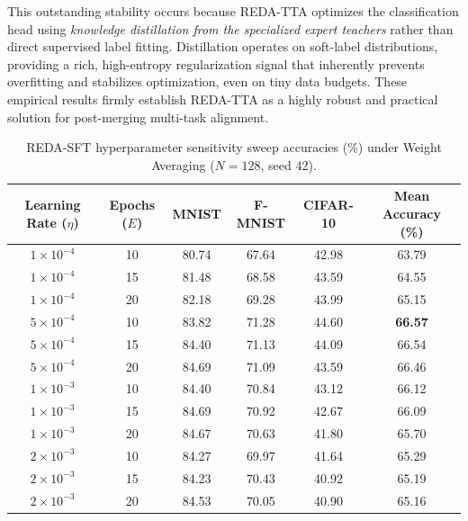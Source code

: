 \documentclass{article}
\theoremstyle{plain}
\theoremstyle{definition}
\theoremstyle{remark}
\begin{document}
This outstanding stability occurs because REDA-TTA optimizes the classification head using \textit{knowledge distillation from the specialized expert teachers} rather than direct supervised label fitting. Distillation operates on soft-label distributions, providing a rich, high-entropy regularization signal that inherently prevents overfitting and stabilizes optimization, even on tiny data budgets. These empirical results firmly establish REDA-TTA as a highly robust and practical solution for post-merging multi-task alignment.

\begin{table}[h]
  \caption{REDA-SFT hyperparameter sensitivity sweep accuracies (\%) under Weight Averaging ($N=128$, seed 42).}
  \label{tab:sft_sweep}
  \centering
  \small
  \begin{tabular}{cccccc}
    \toprule
    Learning Rate ($\eta$) & Epochs ($E$) & MNIST & F-MNIST & CIFAR-10 & Mean Accuracy (\%) \\
    \midrule
    $1 \times 10^{-4}$ & 10 & 80.74 & 67.64 & 42.98 & 63.79 \\
    $1 \times 10^{-4}$ & 15 & 81.48 & 68.58 & 43.59 & 64.55 \\
    $1 \times 10^{-4}$ & 20 & 82.18 & 69.28 & 43.99 & 65.15 \\
    \midrule
    $5 \times 10^{-4}$ & 10 & 83.82 & 71.28 & 44.60 & \textbf{66.57} \\
    $5 \times 10^{-4}$ & 15 & 84.40 & 71.13 & 44.09 & 66.54 \\
    $5 \times 10^{-4}$ & 20 & 84.69 & 71.09 & 43.59 & 66.46 \\
    \midrule
    $1 \times 10^{-3}$ & 10 & 84.40 & 70.84 & 43.12 & 66.12 \\
    $1 \times 10^{-3}$ & 15 & 84.69 & 70.92 & 42.67 & 66.09 \\
    $1 \times 10^{-3}$ & 20 & 84.67 & 70.63 & 41.80 & 65.70 \\
    \midrule
    $2 \times 10^{-3}$ & 10 & 84.27 & 69.97 & 41.64 & 65.29 \\
    $2 \times 10^{-3}$ & 15 & 84.23 & 70.43 & 40.92 & 65.19 \\
    $2 \times 10^{-3}$ & 20 & 84.53 & 70.05 & 40.90 & 65.16 \\
    \bottomrule
  \end{tabular}
\end{table}
\end{document}
